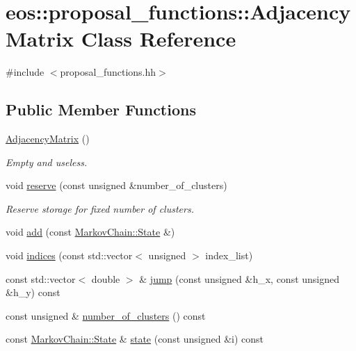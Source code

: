 \hypertarget{classeos_1_1proposal__functions_1_1AdjacencyMatrix}{
\section{eos::proposal\_\-functions::AdjacencyMatrix Class Reference}
\label{classeos_1_1proposal__functions_1_1AdjacencyMatrix}
}


{\ttfamily \#include $<$proposal\_\-functions.hh$>$}\subsection*{Public Member Functions}
\begin{DoxyCompactItemize}
\item 
\hyperlink{classeos_1_1proposal__functions_1_1AdjacencyMatrix_a84ff663285192a136a291ff589b3c87e}{AdjacencyMatrix} ()
\begin{DoxyCompactList}\small\item\em Empty and useless. \item\end{DoxyCompactList}\item 
void \hyperlink{classeos_1_1proposal__functions_1_1AdjacencyMatrix_aae7d3467e9159c0db5e17c31e02a2ba9}{reserve} (const unsigned \&number\_\-of\_\-clusters)
\begin{DoxyCompactList}\small\item\em Reserve storage for fixed number of clusters. \item\end{DoxyCompactList}\item 
void \hyperlink{classeos_1_1proposal__functions_1_1AdjacencyMatrix_a8c5e2e2cf4791c651f2fb93b4cc70b80}{add} (const \hyperlink{structeos_1_1MarkovChain_1_1State}{MarkovChain::State} \&)
\item 
void \hyperlink{classeos_1_1proposal__functions_1_1AdjacencyMatrix_a0578ba400c8091d18f265683de1e801e}{indices} (const std::vector$<$ unsigned $>$ index\_\-list)
\item 
const std::vector$<$ double $>$ \& \hyperlink{classeos_1_1proposal__functions_1_1AdjacencyMatrix_ac32923bdb581f366d9516d0a80e1fa22}{jump} (const unsigned \&h\_\-x, const unsigned \&h\_\-y) const 
\item 
const unsigned \& \hyperlink{classeos_1_1proposal__functions_1_1AdjacencyMatrix_aab2d5eddd479bc4065724a720db51079}{number\_\-of\_\-clusters} () const 
\item 
const \hyperlink{structeos_1_1MarkovChain_1_1State}{MarkovChain::State} \& \hyperlink{classeos_1_1proposal__functions_1_1AdjacencyMatrix_a1effea928a244e6250cb227087b4aafa}{state} (const unsigned \&i) const 
\end{DoxyCompactItemize}



